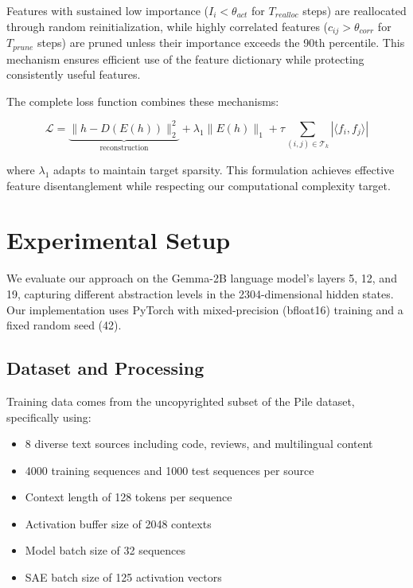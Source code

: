 \documentclass{article} %
\begin{document}
Features with sustained low importance ($I_i < \theta_{act}$ for $T_{realloc}$ steps) are reallocated through random reinitialization, while highly correlated features ($c_{ij} > \theta_{corr}$ for $T_{prune}$ steps) are pruned unless their importance exceeds the 90th percentile. This mechanism ensures efficient use of the feature dictionary while protecting consistently useful features.

The complete loss function combines these mechanisms:

\begin{equation}
    \mathcal{L} = \underbrace{\|h - D(E(h))\|_2^2}_{\text{reconstruction}} + \lambda_1\|E(h)\|_1 + \tau\sum_{(i,j) \in \mathcal{T}_k} |\langle f_i, f_j \rangle|
\end{equation}

where $\lambda_1$ adapts to maintain target sparsity. This formulation achieves effective feature disentanglement while respecting our computational complexity target.

\section{Experimental Setup}
\label{sec:experimental}

We evaluate our approach on the Gemma-2B language model's layers 5, 12, and 19, capturing different abstraction levels in the 2304-dimensional hidden states. Our implementation uses PyTorch with mixed-precision (bfloat16) training and a fixed random seed (42).

\subsection{Dataset and Processing}
Training data comes from the uncopyrighted subset of the Pile dataset, specifically using:
\begin{itemize}
    \item 8 diverse text sources including code, reviews, and multilingual content
    \item 4000 training sequences and 1000 test sequences per source
    \item Context length of 128 tokens per sequence
    \item Activation buffer size of 2048 contexts
    \item Model batch size of 32 sequences
    \item SAE batch size of 125 activation vectors
\end{itemize}
\end{document}
